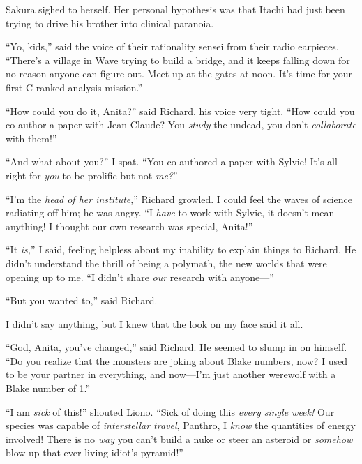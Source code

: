 Sakura sighed to herself. Her personal hypothesis was that Itachi had just been trying to drive his brother into clinical paranoia.

“Yo, kids,” said the voice of their rationality sensei from their radio earpieces. “There’s a village in Wave trying to build a bridge, and it keeps falling down for no reason anyone can figure out. Meet up at the gates at noon. It’s time for your first C-ranked analysis mission.”

\clearpage
{}

“How could you do it, Anita?” said Richard, his voice very tight. “How could you co-author a paper with Jean-Claude? You \emph{study} the undead, you don’t \emph{collaborate} with them!”

“And what about you?” I spat. “You co-authored a paper with Sylvie! It’s all right for \emph{you} to be prolific but not \emph{me?}”

“I’m the \emph{head of her institute},” Richard growled. I could feel the waves of science radiating off him; he was angry. “I \emph{have} to work with Sylvie, it doesn’t mean anything! I thought our own research was special, Anita!”

“It \emph{is,}” I said, feeling helpless about my inability to explain things to Richard. He didn’t understand the thrill of being a polymath, the new worlds that were opening up to me. “I didn’t share \emph{our} research with anyone—”

“But you wanted to,” said Richard.

I didn’t say anything, but I knew that the look on my face said it all.

“God, Anita, you’ve changed,” said Richard. He seemed to slump in on himself. “Do you realize that the monsters are joking about Blake numbers, now? I used to be your partner in everything, and now—I’m just another werewolf with a Blake number of 1.”


“I am \emph{sick} of this!” shouted Liono. “Sick of doing this \emph{every single week!} Our species was capable of \emph{interstellar travel}, Panthro, I \emph{know} the quantities of energy involved! There is no \emph{way} you can’t build a nuke or steer an asteroid or \emph{somehow} blow up that ever-living idiot’s pyramid!”

\clearpage
{}

